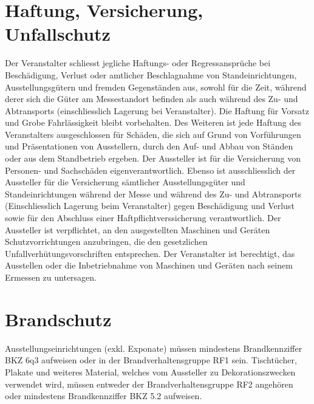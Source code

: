 \documentclass[8pt,a4paper]{article}
\begin{document}
\begin{multicols}{2}
\section{Haftung, Versicherung, Unfallschutz}
Der Veranstalter schliesst jegliche Haftungs- oder Regressansprüche bei Beschädigung, Verlust oder amtlicher Beschlagnahme von Standeinrichtungen, Ausstellungsgütern und fremden Gegenständen aus, sowohl für die Zeit, während derer sich die Güter am Messestandort befinden als auch während des Zu- und Abtransports (einschliesslich Lagerung bei Veranstalter). Die Haftung für Vorsatz und Grobe Fahrlässigkeit bleibt vorbehalten. Des Weiteren ist jede Haftung des Veranstalters ausgeschlossen für Schäden, die sich auf Grund von Vorführungen und Präsentationen von Ausstellern, durch den Auf- und Abbau von Ständen oder aus dem Standbetrieb ergeben. Der Aussteller ist für die Versicherung von Personen- und Sachschäden eigenverantwortlich. Ebenso ist ausschliesslich der Aussteller für die Versicherung sämtlicher Ausstellungsgüter und Standeinrichtungen während der Messe und während des Zu- und Abtransports (Einschliesslich Lagerung beim Veranstalter) gegen Beschädigung und Verlust sowie für den Abschluss einer Haftpflichtverssicherung verantwortlich. Der Aussteller ist verpflichtet, an den ausgestellten Maschinen und Geräten Schutzvorrichtungen anzubringen, die den gesetzlichen Unfallverhütungsvorschriften entsprechen. Der Veranstalter ist berechtigt, das Ausstellen oder die Inbetriebnahme von Maschinen und Geräten nach seinem Ermessen zu untersagen.

\section{Brandschutz}
Ausstellungseinrichtungen (exkl. Exponate) müssen mindestens Brandkennziffer BKZ 6q3 aufweisen oder in der Brandverhaltensgruppe RF1 sein. Tischtücher, Plakate und weiteres Material, welches vom Aussteller zu Dekorationszwecken verwendet wird, müssen entweder der Brandverhaltensgruppe RF2 angehören oder mindestens Brandkennziffer BKZ 5.2 aufweisen.


\end{multicols}
\end{document}
